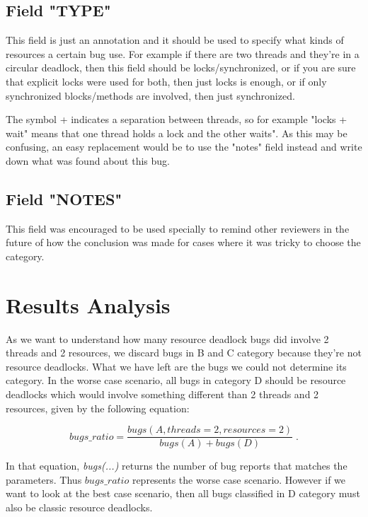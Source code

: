\subsection{Field "TYPE"}

This field is just an annotation and it should be used to specify what kinds of resources a certain bug use. For example if there are two threads and they're in a circular deadlock, then this field should be locks/synchronized, or if you are sure that explicit locks were used for both, then just locks is enough, or if only synchronized blocks/methods are involved, then just synchronized.

The symbol + indicates a separation between threads, so for example "locks + wait" means that one thread holds a lock and the other waits". As this may be confusing, an easy replacement would be to use the "notes" field instead and write down what was found about this bug.

\subsection{Field "NOTES"}

This field was encouraged to be used specially to remind other reviewers in the future of how the conclusion was made for cases where it was tricky to choose the category.

\section{Results Analysis}

As we want to understand how many resource deadlock bugs did involve 2 threads and 2 resources, we discard bugs in B and C category because they're not resource deadlocks. What we have left are the bugs we could not determine its category. In the worse case scenario, all bugs in category D should be resource deadlocks which would involve something different than 2 threads and 2 resources, given by the following equation:

\begin{equation}
bugs\_ratio = \frac{ bugs(A, threads=2, resources=2) }{ bugs(A) + bugs(D) } \; .
\end{equation}

In that equation, \emph{bugs(...)} returns the number of bug reports that matches the parameters. Thus $bugs\_ratio$ represents the worse case scenario. However if we want to look at the best case scenario, then all bugs classified in D category must also be classic resource deadlocks.

